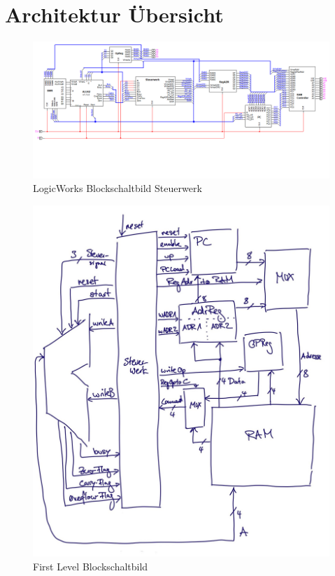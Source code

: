 \chapter{Architektur Übersicht}
\label{chap:Architektur-Übersicht}

\begin{figure}[ht]
  \centering
  \includegraphics[scale=0.5]
  {content/figures/Blockschaltbild-steuerwerk-innen.png}
  \caption{LogicWorks Blockschaltbild Steuerwerk}
  \label{fig:lw-bsb-steuerwerk}
\end{figure}


\begin{figure}[ht]
  \centering
  \includegraphics[scale=0.3]
  {content/figures/BSB_SW.jpg}
  \caption{First Level Blockschaltbild}
  \label{fig:blockschaltbild-first-level}
\end{figure}

